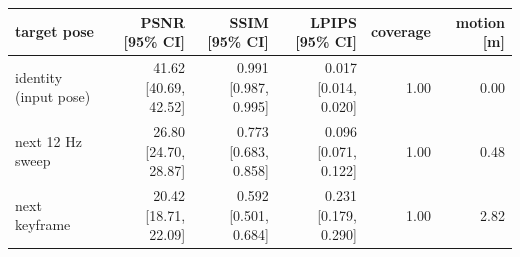 \footnotesize\renewcommand{\arraystretch}{0.92}
\begin{tabular}{lrrrrr}
\toprule
target pose & PSNR [95\% CI] & SSIM [95\% CI] & LPIPS [95\% CI] & coverage & motion [m] \\
\midrule
identity (input pose) & 41.62 [40.69, 42.52] & 0.991 [0.987, 0.995] & 0.017 [0.014, 0.020] & 1.00 & 0.00 \\
next 12 Hz sweep & 26.80 [24.70, 28.87] & 0.773 [0.683, 0.858] & 0.096 [0.071, 0.122] & 1.00 & 0.48 \\
next keyframe & 20.42 [18.71, 22.09] & 0.592 [0.501, 0.684] & 0.231 [0.179, 0.290] & 1.00 & 2.82 \\
\bottomrule
\end{tabular}
